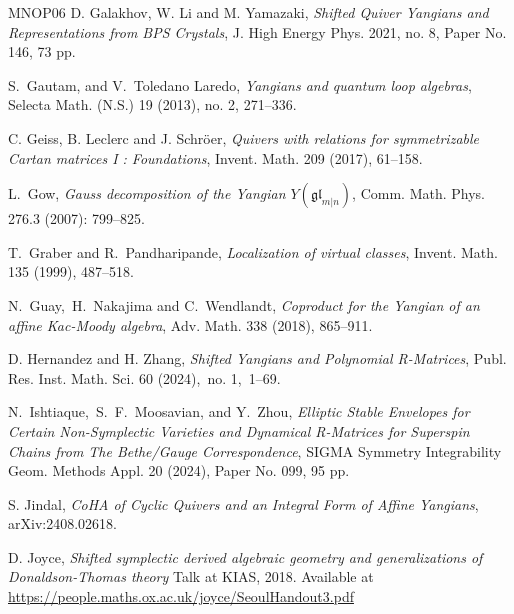 \documentclass[10pt]{amsart}
\theoremstyle{definition}
\numberwithin{equation}{section}
\begin{document}
\begin{thebibliography}{MNOP06}
D. Galakhov, W. Li and M. Yamazaki, \textit{Shifted Quiver Yangians and Representations from BPS Crystals}, 
J. High Energy Phys. 2021, no. 8, Paper No. 146, 73 pp.

 S.~Gautam, and V.~Toledano Laredo, \textit{Yangians and quantum loop algebras}, Selecta Math. (N.S.) 19 (2013), no. 2, 271--336.

C. Geiss, B. Leclerc and J. Schr\"oer, \textit{Quivers with relations for symmetrizable Cartan matrices I : Foundations}, Invent. Math. 209 (2017), 61--158.

 L.~Gow, \textit{Gauss decomposition of the Yangian $Y(\mathfrak{gl}_{m|n})$}, Comm. Math. Phys. 276.3 (2007): 799--825.


T.~Graber and R.~Pandharipande, \textit{Localization of virtual classes}, Invent. Math. 135 (1999), 487--518.

N.~Guay,~H.~Nakajima and C.~Wendlandt, \textit{Coproduct for the Yangian of an affine Kac-Moody algebra}, Adv. Math. 338 (2018), 865--911.



 D. Hernandez and H. Zhang, \textit{Shifted Yangians and Polynomial R-Matrices}, Publ. Res. Inst. Math. Sci. 60 (2024),~no. 1,~1--69.





N.~Ishtiaque,~S.~F.~Moosavian, and Y.~Zhou, \textit{Elliptic Stable Envelopes for Certain Non-Symplectic Varieties and Dynamical R-Matrices for Superspin Chains from The Bethe/Gauge Correspondence}, SIGMA Symmetry Integrability Geom. Methods Appl. 20 (2024), Paper No. 099, 95 pp.


 S. Jindal, \textit{CoHA of Cyclic Quivers and an Integral Form of Affine Yangians}, arXiv:2408.02618.

D. Joyce, \textit{Shifted symplectic derived algebraic geometry and generalizations of Donaldson-Thomas theory} Talk at KIAS, 2018. Available at \url{https://people.maths.ox.ac.uk/joyce/SeoulHandout3.pdf}




\end{thebibliography}
\end{document}
